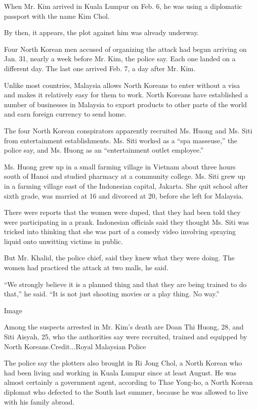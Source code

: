 When Mr. Kim arrived in Kuala Lumpur on Feb. 6, he was using a
diplomatic passport with the name Kim Chol.

By then, it appears, the plot against him was already underway.

Four North Korean men accused of organizing the attack had begun
arriving on Jan. 31, nearly a week before Mr. Kim, the police say. Each
one landed on a different day. The last one arrived Feb. 7, a day after
Mr. Kim.

Unlike most countries, Malaysia allows North Koreans to enter without a
visa and makes it relatively easy for them to work. North Koreans have
established a number of businesses in Malaysia to export products to
other parts of the world and earn foreign currency to send home.

The four North Korean conspirators apparently recruited Ms. Huong and
Ms. Siti from entertainment establishments. Ms. Siti worked as a ``spa
masseuse,'' the police say, and Ms. Huong as an ``entertainment outlet
employee.''

Ms. Huong grew up in a small farming village in Vietnam about three
hours south of Hanoi and studied pharmacy at a community college. Ms.
Siti grew up in a farming village east of the Indonesian capital,
Jakarta. She quit school after sixth grade, was married at 16 and
divorced at 20, before she left for Malaysia.

There were reports that the women were duped, that they had been told
they were participating in a prank. Indonesian officials said they
thought Ms. Siti was tricked into thinking that she was part of a comedy
video involving spraying liquid onto unwitting victims in public.

But Mr. Khalid, the police chief, said they knew what they were doing.
The women had practiced the attack at two malls, he said.

``We strongly believe it is a planned thing and that they are being
trained to do that,'' he said. ``It is not just shooting movies or a
play thing. No way.''

Image

Among the suspects arrested in Mr. Kim's death are Doan Thi Huong, 28,
and Siti Aisyah, 25, who the authorities say were recruited, trained and
equipped by North Koreans.Credit...Royal Malaysian Police

The police say the plotters also brought in Ri Jong Chol, a North Korean
who had been living and working in Kuala Lumpur since at least August.
He was almost certainly a government agent, according to Thae Yong-ho, a
North Korean diplomat who defected to the South last summer, because he
was allowed to live with his family abroad.

